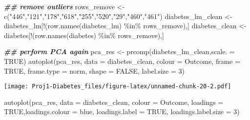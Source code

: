 \documentclass[
]{article}
\newenvironment{Shaded}{\begin{snugshade}}{\end{snugshade}}
\newcommand{\AttributeTok}[1]{\textcolor[rgb]{0.77,0.63,0.00}{#1}}
\newcommand{\ConstantTok}[1]{\textcolor[rgb]{0.00,0.00,0.00}{#1}}
\newcommand{\DecValTok}[1]{\textcolor[rgb]{0.00,0.00,0.81}{#1}}
\newcommand{\DocumentationTok}[1]{\textcolor[rgb]{0.56,0.35,0.01}{\textbf{\textit{#1}}}}
\newcommand{\FunctionTok}[1]{\textcolor[rgb]{0.00,0.00,0.00}{#1}}
\newcommand{\NormalTok}[1]{#1}
\newcommand{\OtherTok}[1]{\textcolor[rgb]{0.56,0.35,0.01}{#1}}
\newcommand{\SpecialCharTok}[1]{\textcolor[rgb]{0.00,0.00,0.00}{#1}}
\newcommand{\StringTok}[1]{\textcolor[rgb]{0.31,0.60,0.02}{#1}}
\begin{document}
\begin{Shaded}
\begin{Highlighting}[]
\DocumentationTok{\#\# remove outliers}
\NormalTok{rows\_remove }\OtherTok{\textless{}{-}} \FunctionTok{c}\NormalTok{(}\StringTok{"446"}\NormalTok{,}\StringTok{"121"}\NormalTok{,}\StringTok{"178"}\NormalTok{,}\StringTok{"618"}\NormalTok{,}\StringTok{"255"}\NormalTok{,}\StringTok{"520"}\NormalTok{,}\StringTok{"29"}\NormalTok{,}\StringTok{"460"}\NormalTok{,}\StringTok{"461"}\NormalTok{)}
\NormalTok{diabetes\_lm\_clean }\OtherTok{\textless{}{-}}\NormalTok{ diabetes\_lm[}\SpecialCharTok{!}\NormalTok{(}\FunctionTok{row.names}\NormalTok{(diabetes\_lm) }\SpecialCharTok{\%in\%}\NormalTok{ rows\_remove),]}
\NormalTok{diabetes\_clean }\OtherTok{\textless{}{-}}\NormalTok{ diabetes[}\SpecialCharTok{!}\NormalTok{(}\FunctionTok{row.names}\NormalTok{(diabetes) }\SpecialCharTok{\%in\%}\NormalTok{ rows\_remove),]}

\DocumentationTok{\#\# perform PCA again}
\NormalTok{pca\_res }\OtherTok{\textless{}{-}} \FunctionTok{prcomp}\NormalTok{(diabetes\_lm\_clean,}\AttributeTok{scale. =} \ConstantTok{TRUE}\NormalTok{)}
\FunctionTok{autoplot}\NormalTok{(pca\_res, }\AttributeTok{data =}\NormalTok{ diabetes\_clean, }\AttributeTok{colour =} \StringTok{\textquotesingle{}Outcome\textquotesingle{}}\NormalTok{,}
         \AttributeTok{frame =} \ConstantTok{TRUE}\NormalTok{, }\AttributeTok{frame.type =} \StringTok{\textquotesingle{}norm\textquotesingle{}}\NormalTok{, }\AttributeTok{shape =} \ConstantTok{FALSE}\NormalTok{, }\AttributeTok{label.size =} \DecValTok{3}\NormalTok{)}
\end{Highlighting}
\end{Shaded}

\texttt{[image: Proj1-Diabetes\_files/figure-latex/unnamed-chunk-20-2.pdf]}

\begin{Shaded}
\begin{Highlighting}[]
\FunctionTok{autoplot}\NormalTok{(pca\_res, }\AttributeTok{data =}\NormalTok{ diabetes\_clean, }\AttributeTok{colour =} \StringTok{\textquotesingle{}Outcome\textquotesingle{}}\NormalTok{,}
         \AttributeTok{loadings =} \ConstantTok{TRUE}\NormalTok{,}\AttributeTok{loadings.colour =} \StringTok{\textquotesingle{}blue\textquotesingle{}}\NormalTok{,}
         \AttributeTok{loadings.label =} \ConstantTok{TRUE}\NormalTok{, }\AttributeTok{loadings.label.size =} \DecValTok{3}\NormalTok{)}
\end{Highlighting}
\end{Shaded}
\end{document}
